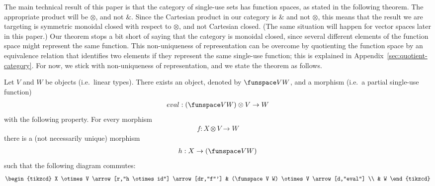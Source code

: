  
The main technical result of this paper is that the category of single-use sets has function spaces, as stated in the following theorem.  The appropriate product will be $\otimes$, and not $\&$. Since the Cartesian product in our category is $\&$ and not $\otimes$, this means that the result we are targeting is symmetric monoidal closed with respect to $\otimes$, and not Cartesian closed. (The same situation will happen  for vector spaces later in this paper.)  Our theorem stops a bit short of saying that the category is monoidal closed, since several different elements of the function space might represent the same function. This non-uniqueness of representation can be overcome  by quotienting the function space  by an equivalence relation that identifies two elements if they represent the same single-use function; this is explained in Appendix~\ref{sec:quotient-category}. For now, we stick with non-uniqueness of representation, and we state the theorem as follows.

\begin{theorem}\label{thm:single-use-closed}
    Let $V$ and $W$ be objects (i.e.~linear types). There exists an object, denoted by  $\funspace V W$, and a morphism (i.e.~a partial single-use function)
    \begin{align*}
    eval : (\funspace V W) \otimes V \to  W
    \end{align*}
    with the following property. For every morphism
    \begin{align*}
    f : {X \otimes V} \to  W
    \end{align*}
    there is a (not necessarily unique) morphism
    \begin{align*}
    h :  X \to (\funspace V W)
    \end{align*}
    such that the following diagram commutes:
    \[
    \begin{tikzcd}
    X \otimes V 
    \arrow[r,"h \otimes id"]
    \arrow[dr,"f"']
    &
    (\funspace V W) \otimes V
    \arrow[d,"eval"] \\
    &
    W
    \end{tikzcd}
    \]
\end{theorem}

